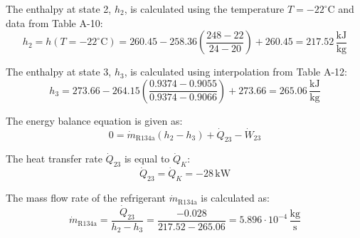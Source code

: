 The enthalpy at state 2, \( h_2 \), is calculated using the temperature \( T = -22^\circ\text{C} \) and data from Table A-10:  
\[
h_2 = h(T = -22^\circ\text{C}) = 260.45 - 258.36 \left(\frac{248 - 22}{24 - 20}\right) + 260.45 = 217.52 \, \frac{\text{kJ}}{\text{kg}}
\]

The enthalpy at state 3, \( h_3 \), is calculated using interpolation from Table A-12:  
\[
h_3 = 273.66 - 264.15 \left(\frac{0.9374 - 0.9055}{0.9374 - 0.9066}\right) + 273.66 = 265.06 \, \frac{\text{kJ}}{\text{kg}}
\]

The energy balance equation is given as:  
\[
0 = \dot{m}_{\text{R134a}} (h_2 - h_3) + \dot{Q}_{23} - \dot{W}_{23}
\]

The heat transfer rate \( \dot{Q}_{23} \) is equal to \( \dot{Q}_K \):  
\[
\dot{Q}_{23} = \dot{Q}_K = -28 \, \text{kW}
\]

The mass flow rate of the refrigerant \( \dot{m}_{\text{R134a}} \) is calculated as:  
\[
\dot{m}_{\text{R134a}} = \frac{\dot{Q}_{23}}{h_2 - h_3} = \frac{-0.028}{217.52 - 265.06} = 5.896 \cdot 10^{-4} \, \frac{\text{kg}}{\text{s}}
\]